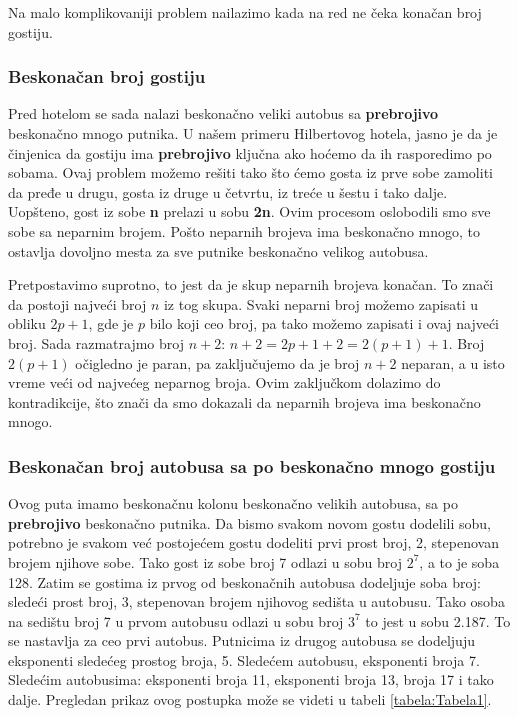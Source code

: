 \documentclass[a4paper]{article}
\begin{document}
Na malo komplikovaniji problem nailazimo kada na red ne čeka konačan broj gostiju.\\

\subsubsection{Beskonačan broj gostiju}
\label{potpotpoglavlje:Beskonačan broj gostiju}
Pred hotelom se sada nalazi beskonačno veliki autobus sa \textbf {prebrojivo} beskonačno mnogo putnika.
U našem primeru Hilbertovog hotela, jasno je da je činjenica da gostiju ima \textbf {prebrojivo} ključna ako hoćemo da ih rasporedimo po sobama.
Ovaj problem možemo rešiti tako što ćemo gosta iz prve sobe zamoliti da pređe u drugu, gosta iz druge u četvrtu, iz treće u šestu i tako dalje.
Uopšteno, gost iz sobe \textbf{n} prelazi u sobu \textbf{2n}. Ovim procesom oslobodili smo sve sobe sa neparnim brojem.
Pošto neparnih brojeva ima beskonačno mnogo, to ostavlja dovoljno mesta za sve putnike beskonačno velikog autobusa.
\vspace{0,5cm}

\vspace{0,1cm}

Pretpostavimo suprotno, to jest da je skup neparnih brojeva konačan.
To znači da postoji najveći broj $n$ iz tog skupa.
Svaki neparni broj možemo zapisati u obliku $2p+1$, gde je $p$ bilo koji ceo broj, pa tako možemo zapisati i ovaj najveći broj.
Sada razmatrajmo broj $n+2$: $n+2=2p+1+2=2(p+1)+1$.
Broj $2(p+1)$ očigledno je paran, pa zaključujemo da je broj $n+2$ neparan, a u isto vreme veći od najvećeg neparnog broja.
Ovim zaključkom dolazimo do kontradikcije, što znači da smo dokazali da neparnih brojeva ima beskonačno mnogo.



\newpage

\subsubsection{Beskonačan broj autobusa sa po beskonačno mnogo gostiju}
\label{potpotpoglavlje:Beskonačan broj autobusa sa po beskonačno mnogo gostiju}
Ovog puta imamo beskonačnu kolonu beskonačno velikih autobusa, sa po \textbf {prebrojivo} beskonačno putnika. Da bismo svakom novom gostu dodelili sobu, potrebno je svakom već postojećem gostu dodeliti prvi prost broj, 2, stepenovan brojem njihove sobe. Tako gost iz sobe broj 7 odlazi u sobu broj $2^7$, a to je soba 128. Zatim se gostima iz prvog od beskonačnih autobusa dodeljuje soba broj: sledeći prost broj, 3, stepenovan brojem njihovog sedišta u autobusu. Tako osoba na sedištu broj 7 u prvom autobusu odlazi u sobu broj $3^7$ to jest u sobu 2.187. To se nastavlja za ceo prvi autobus. Putnicima iz drugog autobusa se dodeljuju eksponenti sledećeg prostog broja, 5. Sledećem autobusu, eksponenti broja 7. Sledećim autobusima: eksponenti broja 11, eksponenti broja 13, broja 17 i tako dalje. Pregledan prikaz ovog postupka može se videti u tabeli \ref{tabela:Tabela1}.
\end{document}
